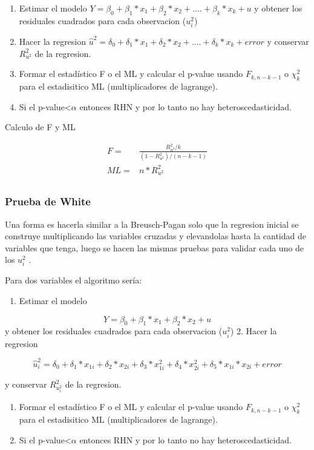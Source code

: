 \documentclass[
]{article}
\providecommand{\tightlist}{%
  \setlength{\itemsep}{0pt}\setlength{\parskip}{0pt}}
\begin{document}
\begin{enumerate}
\def\labelenumi{\arabic{enumi}.}
\tightlist
\item
  Estimar el modelo
  \(Y=\beta_0+\beta_1 *x_1+\beta_2*x_2+....+\beta_k* x_k+u\) y obtener
  los residuales cuadrados para cada observacion (\(u_i^2\))
\item
  Hacer la regresion
  \(\hat u^2=\delta_0+\delta_1 *x_1+\delta_2*x_2+....+\delta_k* x_k+error\)
  y conservar \(R_{u^2}^2\) de la regresion.
\item
  Formar el estadístico F o el ML y calcular el p-value usando
  \(F_{k,n-k-1}\) o \(\chi_k^2\) para el estadisitico ML
  (multiplicadores de lagrange).
\item
  Si el p-value\textless{}\(\alpha\) entonces RHN y por lo tanto no hay
  heteroscedasticidad.
\end{enumerate}

Calculo de F y ML

\[
\begin{aligned}
    F=&\frac{R_{u^2}^2/k}{(1-R_{u^2}^2)/(n-k-1)} \\
    ML=& n*R_{u^2}^2 \\
\end{aligned}
\]

\hypertarget{prueba-de-white}{%
\subsubsection{Prueba de White}\label{prueba-de-white}}

Una forma es hacerla similar a la Breusch-Pagan solo que la regresion
inicial se construye multiplicando las variables cruzadas y elevandolas
hasta la cantidad de variables que tenga, luego se hacen las mismas
pruebas para validar cada uno de los \(u_i^2\) .

Para dos variables el algoritmo sería:

\begin{enumerate}
\def\labelenumi{\arabic{enumi}.}
\tightlist
\item
  Estimar el modelo
\end{enumerate}

\[
Y=\beta_0+\beta_1 *x_1+\beta_2*x_2+u
\] y obtener los residuales cuadrados para cada observacion (\(u_i^2\))
2. Hacer la regresion

\[
\hat u^2_i=\delta_0+\delta_1 *x_{1i}+\delta_2*x_{2i}+\delta_3*x_{1i}^2+\delta_4*x_{2i}^2+\delta_5*x_{1i}*x_{2i}+error
\]

y conservar \(R_{u_i^2}^2\) de la regresion.

\begin{enumerate}
\def\labelenumi{\arabic{enumi}.}
\setcounter{enumi}{2}
\item
  Formar el estadístico F o el ML y calcular el p-value usando
  \(F_{k,n-k-1}\) o \(\chi_k^2\) para el estadisitico ML
  (multiplicadores de lagrange).
\item
  Si el p-value\textless{}\(\alpha\) entonces RHN y por lo tanto no hay
  heteroscedasticidad.
\end{enumerate}
\end{document}
